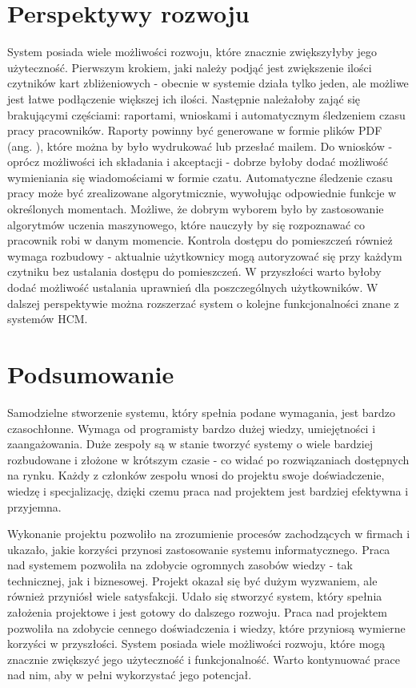 \section{Perspektywy rozwoju}

System posiada wiele możliwości rozwoju, które znacznie zwiększyłyby jego użyteczność. Pierwszym krokiem, jaki należy podjąć jest zwiększenie ilości czytników kart zbliżeniowych - obecnie w systemie działa tylko jeden, ale możliwe jest łatwe podłączenie większej ich ilości. Następnie należałoby zająć się brakującymi częściami: raportami, wnioskami i automatycznym śledzeniem czasu pracy pracowników. Raporty powinny być generowane w formie plików PDF (ang. ), które można by było wydrukować lub przesłać mailem. Do wniosków - oprócz możliwości ich składania i akceptacji - dobrze byłoby dodać możliwość wymieniania się wiadomościami w formie czatu. Automatyczne śledzenie czasu pracy może być zrealizowane algorytmicznie, wywołując odpowiednie funkcje w określonych momentach. Możliwe, że dobrym wyborem było by zastosowanie algorytmów uczenia maszynowego, które nauczyły by się rozpoznawać co pracownik robi w danym momencie. Kontrola dostępu do pomieszczeń również wymaga rozbudowy - aktualnie użytkownicy mogą autoryzować się przy każdym czytniku bez ustalania dostępu do pomieszczeń. W przyszłości warto byłoby dodać możliwość ustalania uprawnień dla poszczególnych użytkowników. W dalszej perspektywie można rozszerzać system o kolejne funkcjonalności znane z systemów HCM.

\section{Podsumowanie}

Samodzielne stworzenie systemu, który spełnia podane wymagania, jest bardzo czasochłonne. Wymaga od programisty bardzo dużej wiedzy, umiejętności i zaangażowania. Duże zespoły są w stanie tworzyć systemy o wiele bardziej rozbudowane i złożone w krótszym czasie - co widać po rozwiązaniach dostępnych na rynku. Każdy z członków zespołu wnosi do projektu swoje doświadczenie, wiedzę i specjalizację, dzięki czemu praca nad projektem jest bardziej efektywna i przyjemna.

Wykonanie projektu pozwoliło na zrozumienie procesów zachodzących w firmach i ukazało, jakie korzyści przynosi zastosowanie systemu informatycznego. Praca nad systemem pozwoliła na zdobycie ogromnych zasobów wiedzy - tak technicznej, jak i biznesowej. Projekt okazał się być dużym wyzwaniem, ale również przyniósł wiele satysfakcji. Udało się stworzyć system, który spełnia założenia projektowe i jest gotowy do dalszego rozwoju. Praca nad projektem pozwoliła na zdobycie cennego doświadczenia i wiedzy, które przyniosą wymierne korzyści w przyszłości. System posiada wiele możliwości rozwoju, które mogą znacznie zwiększyć jego użyteczność i funkcjonalność. Warto kontynuować prace nad nim, aby w pełni wykorzystać jego potencjał.